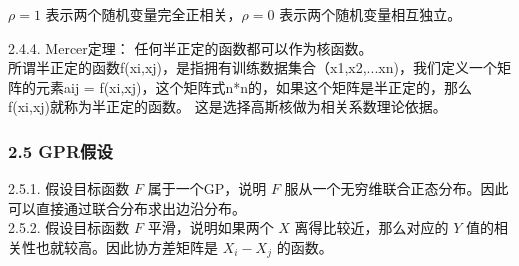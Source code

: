\documentclass[11pt]{article}
\begin{document}
\(\rho=1\) 表示两个随机变量完全正相关，\(\rho=0\)
表示两个随机变量相互独立。

2.4.4. Mercer定理： 任何半正定的函数都可以作为核函数。\\
所谓半正定的函数f(xi,xj)，是指拥有训练数据集合（x1,x2,...xn)，我们定义一个矩阵的元素aij
=
f(xi,xj)，这个矩阵式n*n的，如果这个矩阵是半正定的，那么f(xi,xj)就称为半正定的函数。
这是选择高斯核做为相关系数理论依据。

    \subsubsection{2.5 GPR假设}\label{gprux5047ux8bbe}

2.5.1. 假设目标函数 \(F\) 属于一个GP，说明 \(F\)
服从一个无穷维联合正态分布。因此可以直接通过联合分布求出边沿分布。\\
2.5.2. 假设目标函数 \(F\) 平滑，说明如果两个 \(X\)
离得比较近，那么对应的 \(Y\) 值的相关性也就较高。因此协方差矩阵是
\(X_i-X_j\) 的函数。


    
    
    
    
\end{document}

